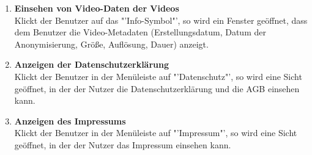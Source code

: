 \begin{enumerate}
\item \label{fa:anonymViddaten}\textbf{Einsehen von Video-Daten der  Videos} \hfill \\
Klickt der Benutzer auf das "'Info-Symbol"', so wird ein Fenster geöffnet, dass dem Benutzer die Video-\gls{Metadaten} (Erstellungsdatum, Datum der Anonymisierung, Größe, Auflösung, Dauer) anzeigt.

\item \textbf{Anzeigen der Datenschutzerklärung} \hfill \\
Klickt der Benutzer in der Menüleiste auf "'Datenschutz"', so wird eine Sicht geöffnet, in der der Nutzer die Datenschutzerklärung und die AGB einsehen kann.

\item \textbf{Anzeigen des Impressums} \hfill \\
Klickt der Benutzer in der Menüleiste auf "'Impressum"', so wird eine Sicht geöffnet, in der der Nutzer das Impressum einsehen kann.
\end{enumerate}